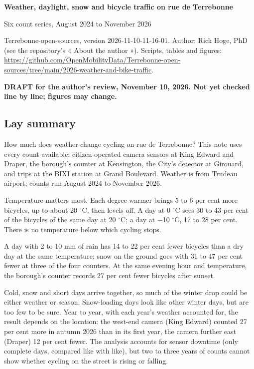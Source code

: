 \documentclass[11pt,a4paper]{article}
\newcommand{\docversion}{2026-11-10-11-16-01}
\begin{document}
{\raggedright\LARGE\bfseries Weather, daylight, snow and bicycle traffic on rue de Terrebonne\par}\vspace{0.3em}
{\large Six count series, August 2024 to November 2026\par}\vspace{0.6em}
{\small Terrebonne-open-sources, version \docversion. Author: Rick Hoge, PhD (see the repository\textquoteright{}s « About the author »). Scripts, tables and figures: \url{https://github.com/OpenMobilityData/Terrebonne-open-sources/tree/main/2026-weather-and-bike-traffic}.\par}
\begin{center}\colorbox{red!15}{\parbox{0.96\textwidth}{\centering\textbf{\textcolor{red!70!black}{DRAFT for the author\textquoteright{}s review, November 10, 2026. Not yet checked line by line; figures may change.}}}}\end{center}
\subsection*{Lay summary}
How much does weather change cycling on rue de Terrebonne? This note uses every count available: citizen-operated camera sensors at King Edward and Draper, the borough\textquoteright{}s counter at Kensington, the City\textquoteright{}s detector at Girouard, and trips at the BIXI station at Grand Boulevard. Weather is from Trudeau airport; counts run August 2024 to November 2026.

Temperature matters most. Each degree warmer brings 5 to 6 per cent more bicycles, up to about 20 $^\circ$C, then levels off. A day at 0 $^\circ$C sees 30 to 43 per cent of the bicycles of the same day at 20 $^\circ$C; a day at $-$10 $^\circ$C, 17 to 28 per cent. There is no temperature below which cycling stops.

A day with 2 to 10 mm of rain has 14 to 22 per cent fewer bicycles than a dry day at the same temperature; snow on the ground goes with 31 to 47 per cent fewer at three of the four counters. At the same evening hour and temperature, the borough\textquoteright{}s counter records 27 per cent fewer bicycles after sunset.

Cold, snow and short days arrive together, so much of the winter drop could be either weather or season. Snow-loading days look like other winter days, but are too few to be sure. Year to year, with each year\textquoteright{}s weather accounted for, the result depends on the location: the west-end camera (King Edward) counted 27 per cent more in autumn 2026 than in its first year, the camera further east (Draper) 12 per cent fewer. The analysis accounts for sensor downtime (only complete days, compared like with like), but two to three years of counts cannot show whether cycling on the street is rising or falling.
\end{document}
